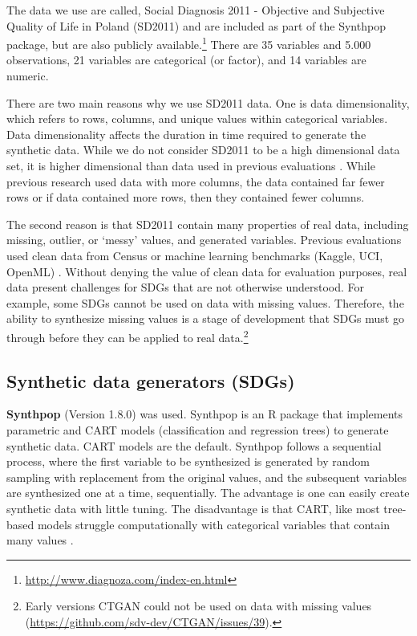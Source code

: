 \documentclass[runningheads]{llncs}
\begin{document}
The data we use are called, Social Diagnosis 2011 - Objective and Subjective Quality of Life in Poland (SD2011) and are included as part of the Synthpop package, but are also publicly available.\footnote{ \url{http://www.diagnoza.com/index-en.html}}  There are 35 variables and 5.000 observations, 21 variables are categorical (or factor), and 14 variables are numeric.  

There are two main reasons why we use SD2011 data.  One is data dimensionality, which refers to rows, columns, and unique values within categorical variables.  Data dimensionality affects the duration in time required to generate the synthetic data.  While we do not consider SD2011 to be a high dimensional data set, it is higher dimensional than data used in previous evaluations \cite{dankar2021fake,little2022comparing}.  While previous research used data with more columns, the data contained far fewer rows or if data contained more rows, then they contained fewer columns.  

The second reason is that SD2011 contain many properties of real data, including missing, outlier, or `messy' values, and generated variables.  Previous evaluations used clean data from Census \cite{little2022comparing} or machine learning benchmarks (Kaggle, UCI, OpenML) \cite{dankar2021fake}.  Without denying the value of clean data for evaluation purposes, real data present challenges for SDGs that are not otherwise understood.  For example, some SDGs cannot be used on data with missing values.  Therefore, the ability to synthesize missing values is a stage of development that SDGs must go through before they can be applied to real data.\footnote{Early versions CTGAN could not be used on data with missing values (\url{https://github.com/sdv-dev/CTGAN/issues/39}).}  

\subsection{Synthetic data generators (SDGs)}

{\bf Synthpop} (Version 1.8.0) \cite{nowok2016synthpop} was used. Synthpop is an \textsf{R} package that implements parametric and CART models (classification and regression trees) to generate synthetic data.  CART models are the default.  Synthpop follows a sequential process, where the first variable to be synthesized is generated by random sampling with replacement from the original values, and the subsequent variables are synthesized one at a time, sequentially.  The advantage is one can easily create synthetic data with little tuning.  The disadvantage is that CART, like most tree-based models struggle computationally with categorical variables that contain many values  \cite{little2022comparing}.  
\end{document}

